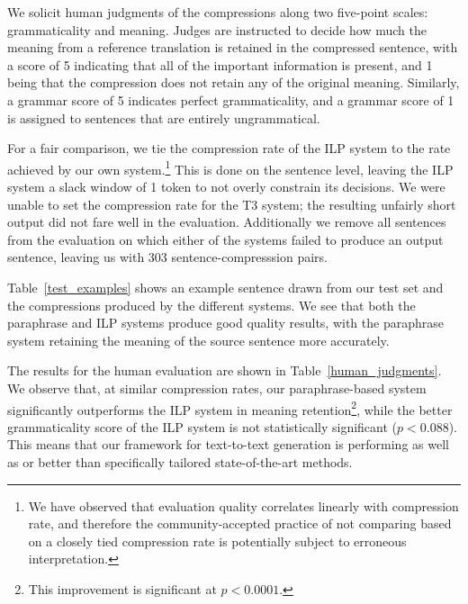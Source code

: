\documentclass[11pt]{article}
\begin{document}
We solicit human judgments of the compressions along two five-point
scales: grammaticality and meaning. Judges are instructed to decide
how much the meaning from a reference translation is retained in the
compressed sentence, with a score of 5 indicating that all of the
important information is present, and 1 being that the compression
does not retain any of the original meaning. Similarly, a grammar
score of 5 indicates perfect grammaticality, and a grammar score of 1
is assigned to sentences that are entirely ungrammatical.

For a fair comparison, we tie the compression rate of the ILP system
to the rate achieved by our own system.\footnote{We have observed that
  evaluation quality correlates linearly with compression rate, and
  therefore the community-accepted practice of not comparing based on
  a closely tied compression rate is potentially subject to erroneous
  interpretation.} This is done on the sentence level, leaving the ILP
system a slack window of 1 token to not overly constrain its
decisions. We were unable to set the compression rate for the T3
system; the resulting unfairly short output did not fare well in the
evaluation.  Additionally we remove all sentences from the evaluation
on which either of the systems failed to produce an output sentence,
leaving us with 303 sentence-compresssion pairs.

Table~\ref{test_examples} shows an example sentence drawn from our
test set and the compressions produced by the different systems. We
see that both the paraphrase and ILP systems produce good quality
results, with the paraphrase system retaining the meaning of the
source sentence more accurately.

The results for the human evaluation are shown in
Table~\ref{human_judgments}. We observe that, at similar compression
rates, our paraphrase-based system significantly outperforms the ILP
system in meaning retention\footnote{This improvement is significant
  at $p < 0.0001$.}, while the better grammaticality score of the ILP
system is not statistically significant ($p < 0.088$). This means that
our framework for text-to-text generation is performing as well as or
better than specifically tailored state-of-the-art methods.
\end{document}
